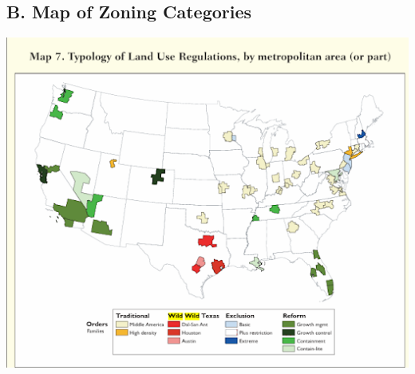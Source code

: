 \documentclass[
  12pt]{article}
\begin{document}
\subsection{B. Map of Zoning
Categories}\label{sec-b.-map-of-zoning-categories}

\includegraphics{images/unnamed (1).png}


  
\end{document}
